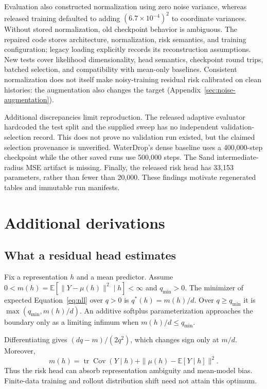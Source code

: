 Evaluation also constructed normalization using zero noise variance, whereas released training defaulted to adding $(6.7\times10^{-4})^2$ to coordinate variances. Without stored normalization, old checkpoint behavior is ambiguous. The repaired code stores architecture, normalization, risk semantics, and training configuration; legacy loading explicitly records its reconstruction assumptions. New tests cover likelihood dimensionality, head semantics, checkpoint round trips, batched selection, and compatibility with mean-only baselines. Consistent normalization does not itself make noisy-training residual risk calibrated on clean histories: the augmentation also changes the target (Appendix~\ref{sec:noise-augmentation}).

Additional discrepancies limit reproduction. The released adaptive evaluator hardcoded the test split and the supplied sweep has no independent validation-selection record. This does not prove no validation run existed, but the claimed selection provenance is unverified. WaterDrop's dense baseline uses a 400,000-step checkpoint while the other saved runs use 500,000 steps. The Sand intermediate-radius MSE artifact is missing. Finally, the released risk head has 33,153 parameters, rather than fewer than 20,000. These findings motivate regenerated tables and immutable run manifests.


\section{Additional derivations}
\subsection{What a residual head estimates}
\label{sec:residual-moment}
\begin{proposition}
Fix a representation $h$ and a mean predictor. Assume $0<m(h)=\mathbb E[\|Y-\mu(h)\|^2\mid h]<\infty$ and $q_{\min}>0$. The minimizer of expected Equation~\ref{eq:nll} over $q>0$ is $q^*(h)=m(h)/d$. Over $q\ge q_{\min}$ it is $\max(q_{\min},m(h)/d)$. An additive softplus parameterization approaches the boundary only as a limiting infimum when $m(h)/d\le q_{\min}$.
\end{proposition}
Differentiating gives $(dq-m)/(2q^2)$, which changes sign only at $m/d$. Moreover,
\begin{equation}
 m(h)=\operatorname{tr}\operatorname{Cov}(Y\mid h)
       +\|\mu(h)-\mathbb E[Y\mid h]\|^2.
\end{equation}
Thus the risk head can absorb representation ambiguity and mean-model bias. Finite-data training and rollout distribution shift need not attain this optimum.

